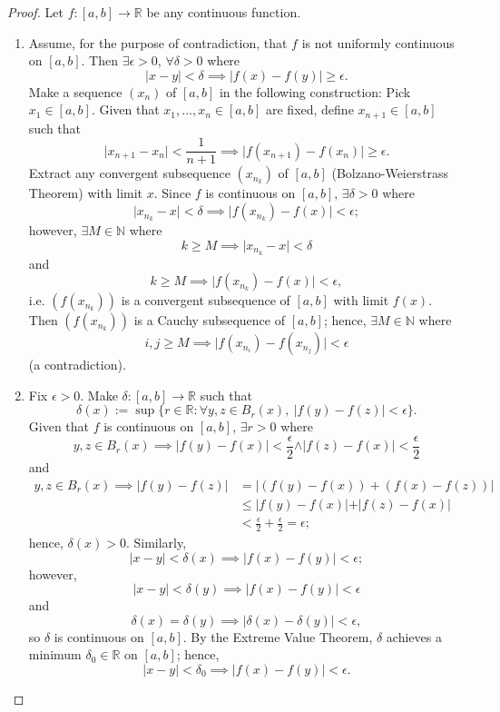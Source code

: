 \documentclass{amsart}
\theoremstyle{definition}
\begin{document}
\begin{proof}
    Let $f: [a,b] \to \mathbb{R}$ be any continuous function.
    \begin{enumerate}[label = (\alph*)]
        \item Assume, for the purpose of contradiction, that $f$ is not uniformly continuous on $[a,b]$. Then $\exists \epsilon > 0$, $\forall \delta > 0$ where
        \[
        \vert x - y \vert < \delta \implies \vert f(x) - f(y) \vert \geq \epsilon.
        \]
        Make a sequence $(x_n)$ of $[a,b]$ in the following construction: Pick $x_1 \in [a,b]$. Given that $x_1,...,x_n \in [a,b]$ are fixed, define $x_{n+1} \in [a,b]$ such that 
        \[
        \vert x_{n+1} - x_n \vert < \frac{1}{n+1} \implies \vert f(x_{n+1}) - f(x_n) \vert \geq \epsilon.
        \]
        Extract any convergent subsequence $(x_{n_k})$ of $[a,b]$ (Bolzano-Weierstrass Theorem) with limit $x$. Since $f$ is continuous on $[a,b]$, $\exists \delta > 0$ where
        \[
        \vert x_{n_{k}} - x \vert < \delta \implies \vert f(x_{n_k}) - f(x) \vert < \epsilon;
        \]
        however, $\exists M \in \mathbb{N}$ where
        \[
        k \geq M \implies \vert x_{n_k} - x \vert < \delta
        \]
        and 
        \[
        k \geq M \implies \vert f(x_{n_k}) - f(x) \vert < \epsilon,
        \]
        i.e. $(f(x_{n_k}))$ is a convergent subsequence of $[a,b]$ with limit $f(x)$. Then $(f(x_{n_k}))$ is a Cauchy subsequence of $[a,b]$; hence, $\exists M \in \mathbb{N}$ where
        \[
        i,j \geq M \implies \vert f(x_{n_i}) - f(x_{n_j}) \vert < \epsilon
        \]
        (a contradiction).
        \item Fix $\epsilon > 0$. Make $\delta: [a,b] \to \mathbb{R}$ such that 
        \[
        \delta(x) := \sup\{r \in \mathbb{R} : \forall y,z \in B_r(x), \ \vert f(y) - f(z) \vert < \epsilon\}.
        \]
        Given that $f$ is continuous on $[a,b]$, $\exists r > 0$ where 
        \[
        y,z \in B_r(x) \implies \vert f(y) - f(x) \vert < \frac{\epsilon}{2} \land \vert f(z) - f(x) \vert < \frac{\epsilon}{2}
        \]
        and 
        \begin{align*}
            y,z \in B_r(x) \implies \vert f(y) - f(z) \vert &= \vert (f(y) - f(x)) + (f(x) - f(z)) \vert \\
            &\leq \vert f(y) - f(x) \vert + \vert f(z) - f(x) \vert \\
            &< \frac{\epsilon}{2} + \frac{\epsilon}{2} = \epsilon;
        \end{align*}
        hence, $\delta(x) > 0$. Similarly, 
        \[
        \vert x - y \vert < \delta(x) \implies \vert f(x) - f(y) \vert < \epsilon;
        \]
        however, 
        \[
        \vert x - y \vert < \delta(y) \implies \vert f(x) - f(y) \vert < \epsilon
        \]
        and 
        \[
        \delta(x) = \delta(y) \implies \vert \delta(x) - \delta(y) \vert < \epsilon,
        \]
        so $\delta$ is continuous on $[a,b]$. By the Extreme Value Theorem, $\delta$ achieves a minimum $\delta_0 \in \mathbb{R}$ on $[a,b]$; hence,
        \[
        \vert x - y \vert < \delta_0 \implies \vert f(x) - f(y) \vert < \epsilon.
        \]
    \end{enumerate}
\end{proof}
\end{document}
